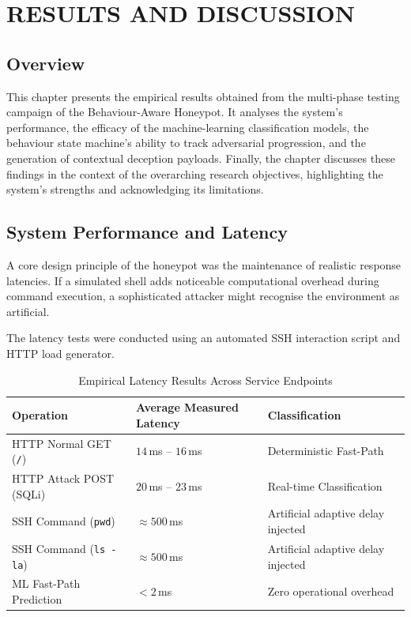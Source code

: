 \chapter{\MakeUppercase{Results and Discussion}}

\section{Overview}

This chapter presents the empirical results obtained from the multi-phase testing campaign of the Behaviour-Aware Honeypot. It analyses the system's performance, the efficacy of the machine-learning classification models, the behaviour state machine's ability to track adversarial progression, and the generation of contextual deception payloads. Finally, the chapter discusses these findings in the context of the overarching research objectives, highlighting the system's strengths and acknowledging its limitations.

\section{System Performance and Latency}

A core design principle of the honeypot was the maintenance of realistic response latencies. If a simulated shell adds noticeable computational overhead during command execution, a sophisticated attacker might recognise the environment as artificial.

The latency tests were conducted using an automated SSH interaction script and HTTP load generator.

\begin{table}[h!]
    \centering
    \caption{Empirical Latency Results Across Service Endpoints}
    \renewcommand{\arraystretch}{1.3}
    \begin{tabular}{|l|l|l|}
        \hline
        \textbf{Operation} & \textbf{Average Measured Latency} & \textbf{Classification} \\
        \hline
        \ac{HTTP} Normal GET (\texttt{/}) & $14$\,ms -- $16$\,ms & Deterministic Fast-Path \\
        \ac{HTTP} Attack POST (SQLi) & $20$\,ms -- $23$\,ms & Real-time Classification \\
        \ac{SSH} Command (\texttt{pwd}) & $\approx 500$\,ms & Artificial adaptive delay injected \\
        \ac{SSH} Command (\texttt{ls -la}) & $\approx 500$\,ms & Artificial adaptive delay injected \\
        ML Fast-Path Prediction & $<2$\,ms & Zero operational overhead \\
        \hline
    \end{tabular}
\end{table}

